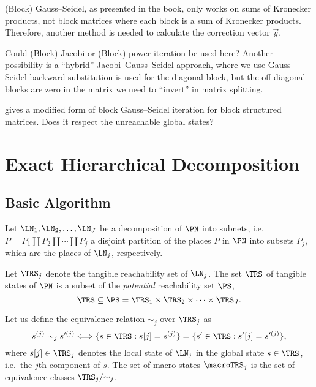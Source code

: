 (Block) Gauss--Seidel, as presented in the book, only works on sums of
Kronecker products, not block matrices where each block is a sum of
Kronecker products. Therefore, another method is needed to calculate
the correction vector $\vec{y}$.

Could (Block) Jacobi or (Block) power iteration \citep[Section
3.2]{dayar2012analyzing} be used here? Another possibility is a
``hybrid'' Jacobi--Gauss--Seidel approach, where we use Gauss--Seidel
backward substitution is used for the diagonal block, but the
off-diagonal blocks are zero in the matrix we need to ``invert'' in
matrix splitting.

\citet[Equation~(16)]{DBLP:journals/questa/Buchholz94} gives a
modified form of block Gauss--Seidel iteration for block structured
matrices. Does it respect the unreachable global states?

\section{Exact Hierarchical Decomposition}

\subsection{Basic Algorithm}

Let $\LN_1, \LN_2, \ldots, \LN_J$ be a decomposition of $\PN$ into
subnets, i.e.~$P = P_1 \coprod P_2 \coprod \cdots \coprod P_j$ a
disjoint partition of the places $P$ in $\PN$ into subsets $P_j$,
which are the places of $\LN_j$, respectively.

Let $\TRS_j$ denote the tangible reachability set of $\LN_j$. The set
$\TRS$ of tangible states of $\PN$ is a subset of the \emph{potential}
reachability set $\PS$,
\begin{equation}
  \TRS \subseteq \PS = \TRS_1 \times \TRS_2 \times \cdots \times
  \TRS_J\text.
\end{equation}

Let us define the equivalence relation $\sim_j$ over $\TRS_j$ as
\begin{equation}\label{eq:kronecker:state-equivalence}
  s^{(j)} \sim_j s'^{(j)} \Longleftrightarrow \{ s \in \TRS : s[j] =
  s^{(j)} \} = \{ s' \in \TRS : s'[j] = s'^{(j)} \} \text,
\end{equation}
where $s[j] \in \TRS_j$ denotes the local state of $\LN_j$ in the
global state $s \in \TRS$, i.e.~the $j$th component of $s$. The set of
macro-states $\macroTRS_j$ is the set of equivalence classes $\TRS_j /
{\sim_j}$.

